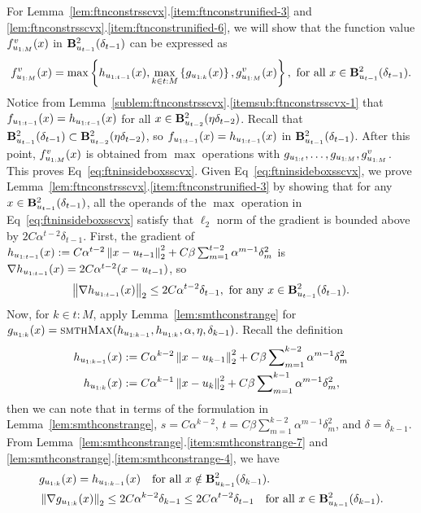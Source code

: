 For Lemma~\ref{lem:ftnconstrsscvx}.\ref{item:ftnconstrunified-3} and \ref{lem:ftnconstrsscvx}.\ref{item:ftnconstrunified-6},
we will show that the function value $f_{u_{1:M}}^v(x)$ in $\mathbf{B}^2_{u_{t-1}}({\delta_{t-1}})$ can be expressed as
\begin{equation}
\label{eq:ftninsideboxsscvx}
f_{u_{1:M}}^v(x) = \max \left \{ h_{u_{1:{t-1}}}(x), \max_{k \in t:M}\left \{ g_{u_{1:{k}}}(x) \right \}, g^{v}_{u_{1:M}}(x) \right \},\text{ for all } x \in \mathbf{B}^2_{u_{t-1}}({\delta_{t-1}}).
\end{equation}
Notice from Lemma~\ref{sublem:ftnconstrsscvx}.\ref{itemsub:ftnconstrsscvx-1} that 
$f_{u_{1:{t-1}}}(x) = h_{u_{1:{t-1}}}(x)$ for all $x \in \mathbf{B}^2_{u_{t-2}}({\eta\delta_{t-2}})$.
Recall that $\mathbf{B}^2_{u_{t-1}}({\delta_{t-1}}) \subset \mathbf{B}^2_{u_{t-2}}({\eta\delta_{t-2}})$, so $f_{u_{1:{t-1}}}(x) = h_{u_{1:{t-1}}}(x)$ in $\mathbf{B}^2_{u_{t-1}}({\delta_{t-1}})$.
After this point, $f_{u_{1:M}}^v(x)$ is obtained from $\max$ operations with $g_{u_{1:{t}}}, \dots, g_{u_{1:{M}}}, g^{v}_{u_{1:M}}$.
This proves Eq~\eqref{eq:ftninsideboxsscvx}. 
Given Eq~\eqref{eq:ftninsideboxsscvx}, we prove Lemma~\ref{lem:ftnconstrsscvx}.\ref{item:ftnconstrunified-3} by showing that for any $x \in \mathbf{B}^2_{u_{t-1}}({\delta_{t-1}})$,
all the operands of the $\max$ operation in Eq~\eqref{eq:ftninsideboxsscvx} satisfy that $\ell_2$ norm of the gradient is 
bounded above by $2C\alpha^{t-2}\delta_{t-1}$.
First, the gradient of $h_{u_{1:{t-1}}}(x) := C\alpha^{t-2} \left\|{x-u_{t-1}}\right\|_2^2 + C\beta \sum_{m=1}^{t-2} \alpha^{m-1}\delta_m^2$
is $\nabla h_{u_{1:{t-1}}}(x) = 2 C\alpha^{t-2}(x-u_{t-1})$, so 
\begin{equation*}
	\left\|{\nabla h_{u_{1:{t-1}}}(x)}\right\|_2 \leq 2 C \alpha^{t-2}\delta_{t-1}, \text{ for any } x \in \mathbf{B}^2_{u_{t-1}}({\delta_{t-1}}).
\end{equation*}
Now, for $k \in t:M$, apply Lemma~\ref{lem:smthconstrange} for $g_{u_{1:{k}}}(x) = \textsc{smthMax}(h_{u_{1:{k-1}}}, h_{u_{1:{k}}}, \alpha, \eta, \delta_{k-1})$.
Recall the definition
\begin{align*}
	h_{u_{1:{k-1}}}(x) &:= C\alpha^{k-2} \left\|{x-u_{k-1}}\right\|_2^2 + C\beta \sum\nolimits_{m=1}^{k-2} \alpha^{m-1}\delta_m^2\\
	h_{u_{1:{k}}}(x) &:= C\alpha^{k-1} \left\|{x-u_{k}}\right\|_2^2 + C\beta \sum\nolimits_{m=1}^{k-1} \alpha^{m-1}\delta_m^2,
\end{align*}
then we can note that in terms of the formulation in Lemma~\ref{lem:smthconstrange},
$s = C\alpha^{k-2}$, $t = C\beta \sum_{m=1}^{k-2} \alpha^{m-1}\delta_m^2$, and $\delta = \delta_{k-1}$.
From Lemma~\ref{lem:smthconstrange}.\ref{item:smthconstrange-7} and \ref{lem:smthconstrange}.\ref{item:smthconstrange-4}, we have
\begin{align*}
	&g_{u_{1:{k}}}(x) = h_{u_{1:{k-1}}}(x) \quad \text{for all } x\notin \mathbf{B}^2_{u_{k-1}}({\delta_{k-1}}).\\
	&\left\|{\nabla g_{u_{1:{k}}}(x)}\right\|_2 \leq 2 C\alpha^{k-2} \delta_{k-1} \leq 2 C \alpha^{t-2}\delta_{t-1} \quad \text{for all } x \in \mathbf{B}^2_{u_{k-1}}({\delta_{k-1}}).
\end{align*}
